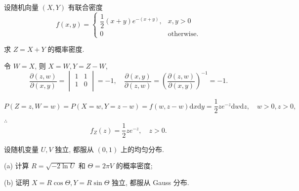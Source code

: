 \documentclass{ctexart}
\begin{document}
\begin{exercise}%
    设随机向量 $(X,Y)$ 有联合密度
    \[f(x,y)=\begin{cases}
        \dfrac{1}{2}(x+y)e^{-(x+y)}, & x,y>0 \\
        0 & \text{otherwise}.
    \end{cases}\]

    求 $Z=X+Y$ 的概率密度.
\end{exercise}
\begin{solution}
    令 $W=X$, 则 $X=W,Y=Z-W$,
    \[\dfrac{\partial(z,w)}{\partial(x,y)}=\begin{vmatrix}
        1 & 1 \\
        1 & 0 \\
    \end{vmatrix}=-1,\quad\dfrac{\partial(x,y)}{\partial(z,w)}=\left(\dfrac{\partial(z,w)}{\partial(x,y)}\right)^{-1}=-1.\]

    \[P(Z=z,W=w)=P(X=w,Y=z-w)=f(w,z-w)\mathrm{d}x\mathrm{d}y=\dfrac{1}{2}ze^{-z}\mathrm{d}w\mathrm{d}z,\quad w>0,z>0,\]

    $\therefore$
    \[f_Z(z)=\dfrac{1}{2}ze^{-z},\quad z>0.\]
\end{solution}
\addtocounter{exercise}{1}
\begin{exercise}%
    设随机变量 $U,V$ 独立, 都服从 $(0,1)$ 上的均匀分布.

    (a) 计算 $R=\sqrt{-2\ln U}$ 和 $\Theta=2\pi V$ 的概率密度;

    (b) 证明 $X=R\cos\Theta,Y=R\sin\Theta$ 独立, 都服从 Gauss 分布.
\end{exercise}
\end{document}
